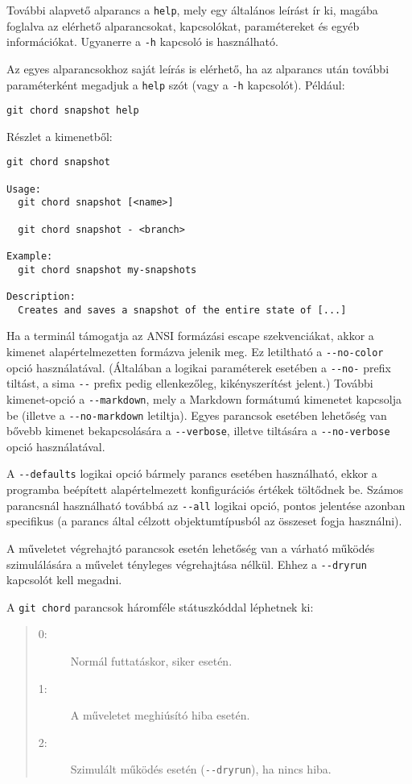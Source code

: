 \documentclass[final]{elteikthesis}[2025/03/25]
\begin{document}
További alapvető alparancs a \verb|help|, mely egy általános leírást ír ki,
magába foglalva az elérhető alparancsokat, kapcsolókat, paramétereket és egyéb információkat.
Ugyanerre a \verb|-h| kapcsoló is használható.

Az egyes alparancsokhoz saját leírás is elérhető,
ha az alparancs után további paraméterként megadjuk a \verb|help| szót
(vagy a \verb|-h| kapcsolót).
Például:

\begin{verbatim}
git chord snapshot help
\end{verbatim}

Részlet a kimenetből:

\begin{verbatim}
git chord snapshot

Usage:
  git chord snapshot [<name>]

  git chord snapshot - <branch>

Example:
  git chord snapshot my-snapshots

Description:
  Creates and saves a snapshot of the entire state of [...]
\end{verbatim}

Ha a terminál támogatja az ANSI formázási escape szekvenciákat,
akkor a kimenet alapértelmezetten formázva jelenik meg.
Ez letiltható a \verb|--no-color| opció használatával.
(Általában a logikai paraméterek esetében a \verb|--no-| prefix tiltást,
a sima \verb|--| prefix pedig ellenkezőleg, kikényszerítést jelent.)
További kimenet-opció a \verb|--markdown|, mely a Markdown formátumú kimenetet kapcsolja be (illetve a \verb|--no-markdown| letiltja).
Egyes parancsok esetében lehetőség van bővebb kimenet bekapcsolására a \verb|--verbose|,
illetve tiltására a \verb|--no-verbose| opció használatával.

A \verb|--defaults| logikai opció bármely parancs esetében használható,
ekkor a programba beépített alapértelmezett konfigurációs értékek töltődnek be.
Számos parancsnál használható továbbá az \verb|--all| logikai opció,
pontos jelentése azonban specifikus
(a parancs által célzott objektumtípusból az összeset fogja használni).

A műveletet végrehajtó parancsok esetén lehetőség van a várható működés szimulálására
a művelet tényleges végrehajtása nélkül.
Ehhez a \verb|--dryrun| kapcsolót kell megadni.

A \texttt{git chord} parancsok háromféle státuszkóddal léphetnek ki:

\begin{quote}
\begin{description}
    \item[0:] Normál futtatáskor, siker esetén.
    \item[1:] A műveletet meghiúsító hiba esetén.
    \item[2:] Szimulált működés esetén (\verb|--dryrun|), ha nincs hiba.
\end{description}
\end{quote}
\end{document}

